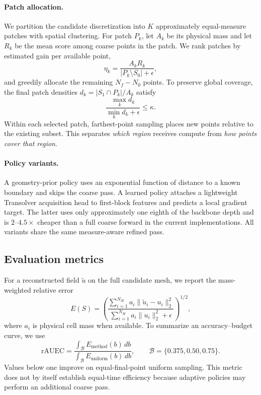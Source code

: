 \documentclass{article}
\newcommand{\rauec}{\mathrm{rAUEC}}
\begin{document}
\paragraph{Patch allocation.}
We partition the candidate discretization into $K$ approximately equal-measure
patches with spatial clustering. For patch $P_k$, let $A_k$ be its physical
mass and let $R_k$ be the mean score among coarse points in the patch. We rank
patches by estimated gain per available point,
\begin{equation}
\eta_k = \frac{A_kR_k}{|P_k\setminus S_0|+\epsilon},
\end{equation}
and greedily allocate the remaining $N_f-N_0$ points. To preserve global
coverage, the final patch densities $d_k=|S_1\cap P_k|/A_k$ satisfy
\begin{equation}
\frac{\max_k d_k}{\min_k d_k+\epsilon}\leq\kappa.
\end{equation}
Within each selected patch, farthest-point sampling places new points relative
to the existing subset. This separates \emph{which region} receives compute
from \emph{how points cover that region}.

\paragraph{Policy variants.}
A geometry-prior policy uses an exponential function of distance to a known
boundary and skips the coarse pass. A learned policy attaches a lightweight
Transolver acquisition head to first-block features and predicts a local
gradient target. The latter uses only approximately one eighth of the backbone
depth and is $2$--$4.5\times$ cheaper than a full coarse forward in the current
implementations. All variants share the same measure-aware refined pass.

\subsection{Evaluation metrics}

For a reconstructed field $\widetilde u$ on the full candidate mesh, we report
the mass-weighted relative error
\begin{equation}
E(S)=\left(
\frac{\sum_{i=1}^{N_H} a_i\|\widetilde u_i-u_i\|_2^2}
     {\sum_{i=1}^{N_H} a_i\|u_i\|_2^2+\epsilon}
\right)^{1/2},
\end{equation}
where $a_i$ is physical cell mass when available. To summarize an
accuracy--budget curve, we use
\begin{equation}
\rauec =
\frac{\int_{\mathcal{B}} E_{\mathrm{method}}(b)\,db}
     {\int_{\mathcal{B}} E_{\mathrm{uniform}}(b)\,db},
\qquad \mathcal{B}=\{0.375,0.50,0.75\}.
\end{equation}
Values below one improve on equal-final-point uniform sampling. This metric does
not by itself establish equal-time efficiency because adaptive policies may
perform an additional coarse pass.
\end{document}
